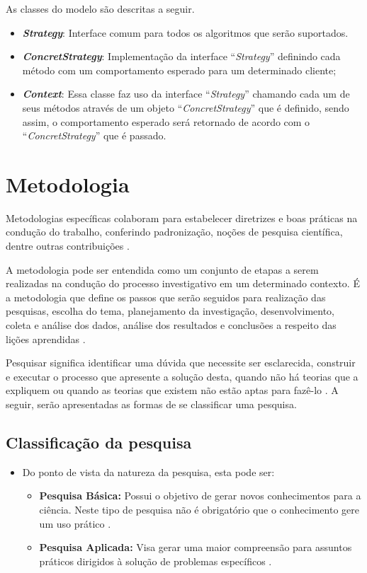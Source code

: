 \begin{apendicesenv}
As classes do modelo são descritas a seguir.

\begin{itemize}
	\item \textbf{\textit{Strategy}}: Interface comum para todos os algoritmos que serão suportados.
	\item \textbf{\textit{ConcretStrategy}}: Implementação da interface ``\textit{Strategy}'' definindo cada método com um comportamento esperado para um determinado cliente;
	\item \textbf{\textit{Context}}: Essa classe faz uso da interface ``\textit{Strategy}'' chamando cada um de seus métodos através de um objeto ``\textit{ConcretStrategy}'' que é definido, sendo assim,  o comportamento esperado será retornado de acordo com o ``\textit{ConcretStrategy}'' que é passado.
\end{itemize}

\chapter{Metodologia}
\label{apend_chap:metodologia}

Metodologias específicas colaboram para estabelecer diretrizes e boas práticas na condução do trabalho, conferindo padronização, noções de pesquisa científica, dentre outras contribuições \cite{Wohlin:2000}.

A metodologia pode ser entendida como um conjunto de etapas a serem realizadas na condução do processo investigativo em um determinado contexto. É a metodologia que define os passos que serão seguidos para realização das pesquisas, escolha do tema, planejamento da investigação, desenvolvimento, coleta e análise dos dados, análise dos resultados e conclusões a respeito das lições aprendidas \cite{Moresi:2003}.

Pesquisar significa identificar uma dúvida que necessite ser esclarecida, construir e executar o processo que apresente a solução desta, quando não há teorias que a expliquem ou quando as teorias que existem não estão aptas para fazê-lo \cite{Koche:1997}. A seguir, serão apresentadas as formas de se classificar uma pesquisa.

\section{Classificação da pesquisa}

\begin{itemize}
	\item Do ponto de vista da natureza da pesquisa, esta pode ser:
		\begin{itemize}
			\item \textbf{Pesquisa Básica:} Possui o objetivo de gerar novos conhecimentos para a ciência. Neste tipo de pesquisa não é obrigatório que o conhecimento gere um uso prático \cite{Silva:Tafner:2007}.
			\item \textbf{Pesquisa Aplicada:} Visa gerar uma maior compreensão para assuntos práticos dirigidos à solução de problemas específicos \cite{Silva:Tafner:2007}.
		\end{itemize}


\end{itemize}
\end{apendicesenv}
